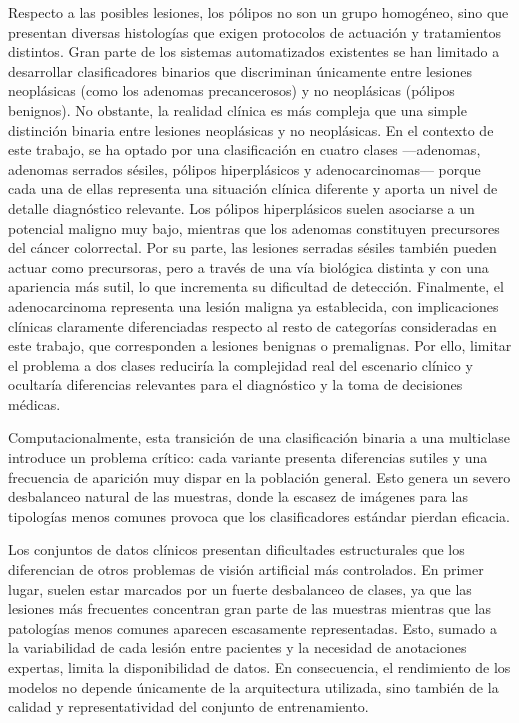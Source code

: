 ﻿\documentclass[10pt,a4paper,twocolumn,twoside]{article}
\begin{document}
Respecto a las posibles lesiones, los pólipos no son un grupo homogéneo, sino que presentan diversas histologías que exigen protocolos de actuación y tratamientos distintos. Gran parte de los sistemas automatizados existentes se han limitado a desarrollar clasificadores binarios que discriminan únicamente entre lesiones neoplásicas (como los adenomas precancerosos) y no neoplásicas (pólipos benignos). No obstante, la realidad clínica es más compleja que una simple distinción binaria entre lesiones neoplásicas y no neoplásicas. En el contexto de este trabajo, se ha optado por una clasificación en cuatro clases —adenomas, adenomas serrados sésiles, pólipos hiperplásicos y adenocarcinomas— porque cada una de ellas representa una situación clínica diferente y aporta un nivel de detalle diagnóstico relevante. Los pólipos hiperplásicos suelen asociarse a un potencial maligno muy bajo, mientras que los adenomas constituyen precursores del cáncer colorrectal. Por su parte, las lesiones serradas sésiles también pueden actuar como precursoras, pero a través de una vía biológica distinta y con una apariencia más sutil, lo que incrementa su dificultad de detección. Finalmente, el adenocarcinoma representa una lesión maligna ya establecida, con implicaciones clínicas claramente diferenciadas respecto al resto de categorías consideradas en este trabajo, que corresponden a lesiones benignas o premalignas. Por ello, limitar el problema a dos clases reduciría la complejidad real del escenario clínico y ocultaría diferencias relevantes para el diagnóstico y la toma de decisiones médicas.\cite{rex2012,nih_colon_treatment}

Computacionalmente, esta transición de una clasificación binaria a una multiclase introduce un problema crítico: cada variante presenta diferencias sutiles y una frecuencia de aparición muy dispar en la población general. Esto genera un severo desbalanceo natural de las muestras, donde la escasez de imágenes para las tipologías menos comunes provoca que los clasificadores estándar pierdan eficacia.

Los conjuntos de datos clínicos presentan dificultades estructurales que los diferencian de otros problemas de visión artificial más controlados. En primer lugar, suelen estar marcados por un fuerte desbalanceo de clases, ya que las lesiones más frecuentes concentran gran parte de las muestras mientras que las patologías menos comunes aparecen escasamente representadas. Esto, sumado a la variabilidad de cada lesión entre pacientes y la necesidad de anotaciones expertas, limita la disponibilidad de datos. En consecuencia, el rendimiento de los modelos no depende únicamente de la arquitectura utilizada, sino también de la calidad y representatividad del conjunto de entrenamiento.\cite{salmi2024imbalanced}
\end{document}
